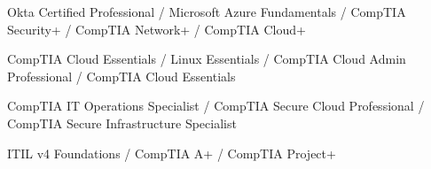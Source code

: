 
\begin{cvskills}

	\cvskill
	{}{Okta Certified Professional / Microsoft Azure Fundamentals / CompTIA Security+ / CompTIA Network+ / CompTIA Cloud+}

	\cvskill
	{}{CompTIA Cloud Essentials / Linux Essentials / CompTIA Cloud Admin Professional / CompTIA Cloud Essentials}

	\cvskill
	{}{CompTIA IT Operations Specialist / CompTIA Secure Cloud Professional / CompTIA Secure Infrastructure Specialist}

	\cvskill
	{}{ITIL v4 Foundations / CompTIA A+ / CompTIA Project+}

\end{cvskills}

